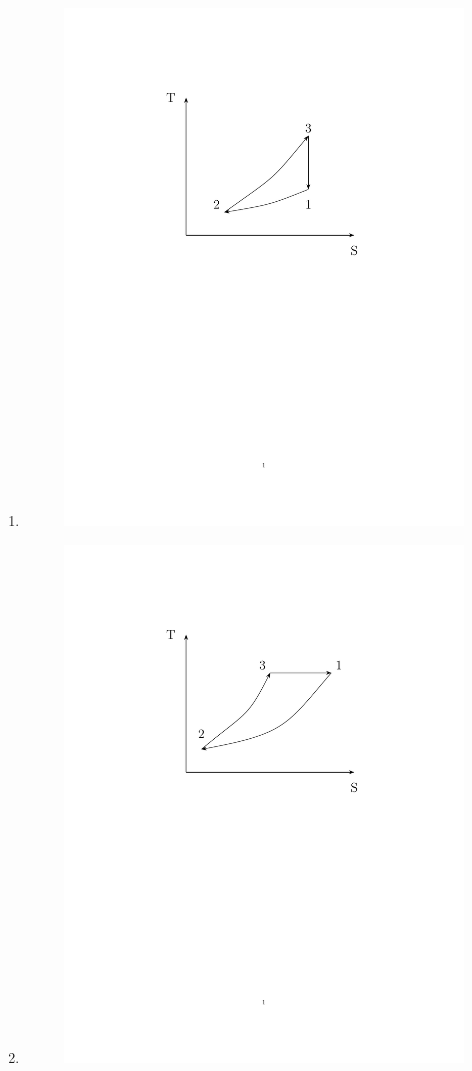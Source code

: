 \documentclass[journal,12pt,onecolumn,article]{IEEEtran}
\theoremstyle{remark}
\begin{document}
\begin{enumerate}
\begin{enumerate}
			\item
					\begin{figure}[H]
						\begin{minipage}{0.5\textwidth}
	\includegraphics[width=0.7\linewidth]{figs/fig74c/main.pdf}
						\end{minipage}
						\vspace{-180pt}
\end{figure}

			\item
					\begin{figure}[H]
						\begin{minipage}{0.5\textwidth}
	\includegraphics[width=0.7\linewidth]{figs/fig74d/main.pdf}
						\end{minipage}
						\vspace{-190pt}
\end{figure}


\end{enumerate}
\end{enumerate}
\end{document}
